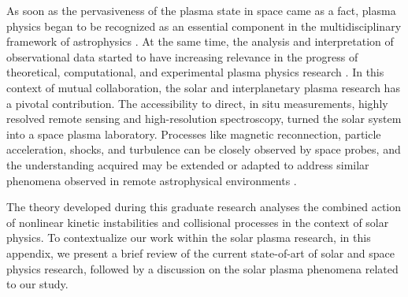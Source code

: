 \documentclass[12pt,a4paper,ruledheader]{report}
\begin{document}
\begin{appendix}
As soon as the pervasiveness of the plasma state in space came as a fact,
plasma physics began to be recognized as an essential component in the
multidisciplinary framework of astrophysics \cite{Alfven1950,Parker1956,
  Alfven1961,Gailitis1964,Alfven1971}. At the same time, the analysis and
interpretation of observational data started to have increasing relevance
in the progress of theoretical, computational, and experimental plasma
physics research \cite{YZKS16,Donnert2014,Pezzi2018,Howes2018,Peterson2019}.
In this context of mutual collaboration, the solar and interplanetary
plasma research has a pivotal contribution. The accessibility to direct,
in situ measurements, highly resolved remote sensing and high-resolution
spectroscopy, turned the solar system into a space plasma laboratory.
Processes like magnetic reconnection, particle acceleration, shocks, and
turbulence can be closely observed by space probes, and the understanding
acquired may be extended or adapted to address similar phenomena observed
in remote astrophysical environments \cite{NAP10477}. 

The theory developed during this graduate research analyses the combined
action of nonlinear kinetic instabilities and collisional processes in
the context of solar physics. To contextualize our work within the solar
plasma research, in this appendix, we present a brief review of the
current state-of-art of solar and space physics research, followed by a
discussion on the solar plasma phenomena related to our study.



\end{appendix}
\end{document}
